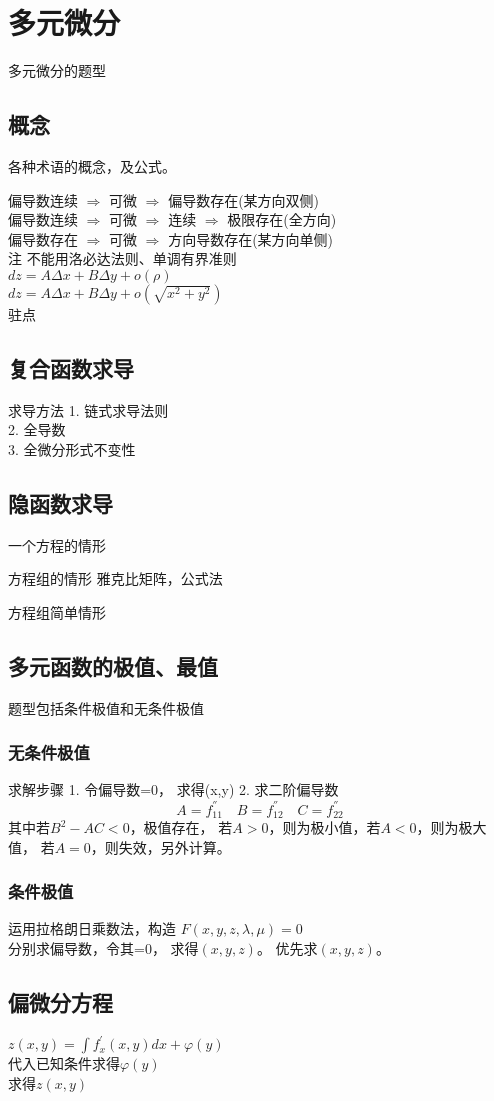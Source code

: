 \chapter{多元微分}


多元微分的题型

\section{概念}
各种术语的概念，及公式。

\noindent
偏导数连续 $\Longrightarrow$ 可微 $\Longrightarrow$ 偏导数存在(某方向双侧) \\
偏导数连续 $\Longrightarrow$ 可微 $\Longrightarrow$ 连续 $\Longrightarrow$ 极限存在(全方向) \\
偏导数存在 $\Longrightarrow$ 可微 $\Longrightarrow$ 方向导数存在(某方向单侧) \\

注
不能用洛必达法则、单调有界准则 \\
$dz = A\Delta x + B\Delta y + o(\rho)$ \\
$dz = A\Delta x + B\Delta y + o(\sqrt{x^2+y^2})$ \\


驻点

\section{复合函数求导}
求导方法
1. 链式求导法则 \\ 
2. 全导数 \\
3. 全微分形式不变性 \\



\section{隐函数求导}
一个方程的情形

方程组的情形
雅克比矩阵，公式法 

方程组简单情形



\section{多元函数的极值、最值}
题型包括条件极值和无条件极值

\subsection{无条件极值}
求解步骤
1. 令偏导数=0， 求得(x,y)
2. 求二阶偏导数
$$
A = f_{11}^{''} \quad{}  B = f_{12}^{''} \quad{} C = f_{22}^{''}
$$
其中若$B^2 - AC < 0$，极值存在，
若$A > 0$，则为极小值，若$A < 0$，则为极大值，
若$A = 0$，则失效，另外计算。


\subsection{条件极值}
运用拉格朗日乘数法，构造
$F(x, y, z, \lambda, \mu) = 0$ \\
分别求偏导数，令其=0， 求得$(x, y, z)$。
优先求$(x, y, z)$。 

\section{偏微分方程}

$z(x,y) = \int f_x^{'}(x,y) dx + \varphi(y)$ \\
代入已知条件求得$\varphi(y)$ \\
求得$z(x,y)$ \\
